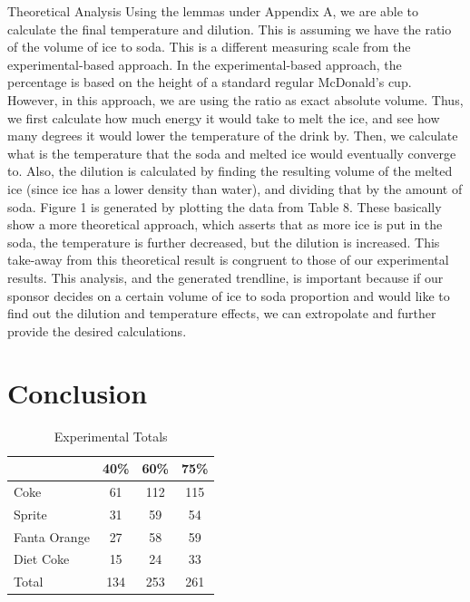 \documentclass[oneside,12pt]{report}
\def\prefacesection#1{
\chapter*{#1}
\addcontentsline{toc}{chapter}{#1}
}
\begin{document}
\vspace{12pt}

Theoretical Analysis
\vspace{12pt}
\newline
Using the lemmas under Appendix A, we are able to calculate the final temperature and dilution. This is assuming we have the ratio of the volume of ice to soda. This is a different measuring scale from the experimental-based approach. In the experimental-based approach, the percentage is based on the height of a standard regular McDonald's cup. However, in this approach, we are using the ratio as exact absolute volume. Thus, we first calculate how much energy it would take to melt the ice, and see how many degrees it would lower the temperature of the drink by. Then, we calculate what is the temperature that the soda and melted ice would eventually converge to. Also, the dilution is calculated by finding the resulting volume of the melted ice (since ice has a lower density than water), and dividing that by the amount of soda.
\vspace{12pt}
\newline
Figure 1 is generated by plotting the data from Table 8. These basically show a more theoretical approach, which asserts that as more ice is put in the soda, the temperature is further decreased, but the dilution is increased. This take-away from this theoretical result is congruent to those of our experimental results.  This analysis, and the generated trendline, is important because if our sponsor decides on a certain volume of ice to soda proportion and would like to find out the dilution and temperature effects, we can extropolate and further provide the desired calculations. 

%

\prefacesection{Conclusion}

\begin{table}[ h]
\centering
\begin{tabular}{ l || c|c|c }
  &40\% &60\% & 75\%  \\
\hline  
Coke & 61 & 112 & 115 \\
\hline  
Sprite & 31& 59 & 54 \\
\hline  
Fanta Orange & 27 & 58 & 59 \\ 
\hline  
Diet Coke & 15 & 24& 33 \\ 
\hline  
Total & 134 & 253 & 261  \\ 
\hline     
 \end{tabular}
\caption{Experimental Totals}
\end{table}
\end{document}
